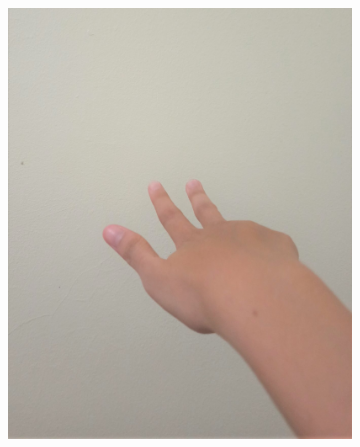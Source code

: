 \documentclass[conference]{IEEEtran}
\begin{document}
\begin{figure} [h]
\begin{center}
\begin{subfigure}[t]{0.11\textwidth}
				\includegraphics[width=\textwidth]{img/pola3c.jpg}
				\caption{\label{fig:gs3c}}
			\end{subfigure}
			\hspace{0.1em}
			\begin{subfigure}[t]{0.11\textwidth}

\end{subfigure}
\end{center}
\end{figure}
\end{document}
